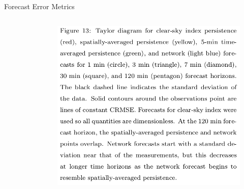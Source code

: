 \documentclass[aspectratio=169]{beamer}
\begin{document}
\begin{frame}{Forecast Error Metrics}
\begin{columns}
\begin{column}{0.3\textwidth}
\begin{figure}[h]
\end{figure}
\end{column}
\begin{column}{0.3\textwidth}
\begin{figure}[h]
  \includegraphics[height=.5\textheight]{figs/old_taylor_cap.png}
\end{figure}
\end{column}
\end{columns}
\end{frame}
\end{document}
